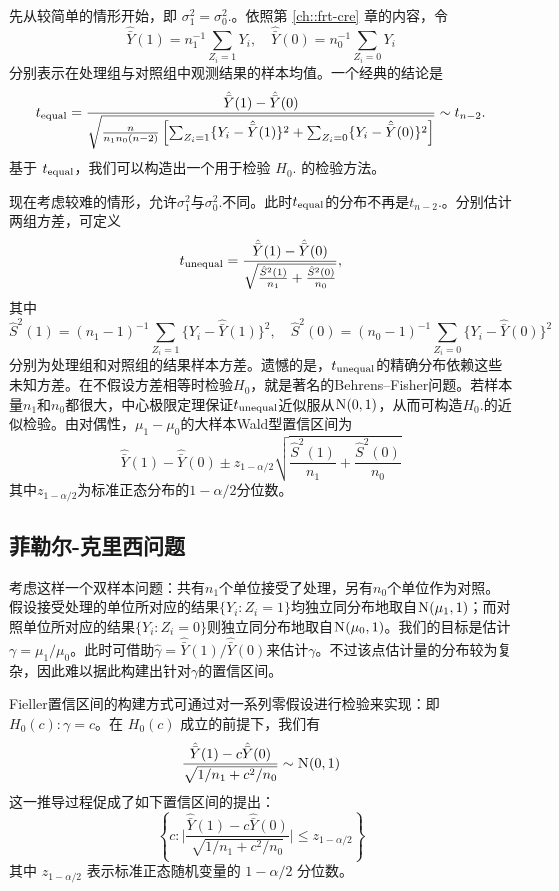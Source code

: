 先从较简单的情形开始，即 $\sigma_1^2  = \sigma_0^2.$。依照第 \ref{ch::frt-cre} 章的内容，令 $$
\hat{\bar{Y}}(1) = n_1^{-1} \sum_{Z_i =1}  Y_i ,\quad
\hat{\bar{Y}}(0) = n_0^{-1} \sum_{Z_i =0}  Y_i
$$ 分别表示在处理组与对照组中观测结果的样本均值。一个经典的结论是 $$
t_\textup{equal} = 
\frac{  \hat{\bar{Y}}(1) - \hat{\bar{Y}}(0)    }{  \sqrt{\frac{n}{n_1 n_0(n-2)}  \left[  \sum_{Z_i=1}  \{Y_i - \hat{\bar{Y}}(1)\}^2
+ \sum_{Z_i=0}  \{Y_i - \hat{\bar{Y}}(0)\}^2
    \right]  }    }   \sim t_{n-2}.
$$基于 $t_\textup{equal} $，我们可以构造出一个用于检验 $H_0.$ 的检验方法。


现在考虑较难的情形，允许$\sigma_1^2  $与$ \sigma_0^2.$不同。此时$t_\textup{equal}$的分布不再是$t_{n-2}.$。分别估计两组方差，可定义$$
t_\textup{unequal} = \frac{    \hat{\bar{Y}}(1)  -   \hat{\bar{Y}}(0)    }{  \sqrt{  \frac{  \hat{S}^2(1)  }{n_1}  + \frac{\hat{S}^2(0)}{n_0}  }   },
$$其中$$
\hat{S}^2(1) = (n_1 - 1)^{-1} \sum_{Z_i =1} \{ Y_i  -\hat{\bar{Y}}(1)   \}^2,\quad
\hat{S}^2(0) = (n_0 - 1)^{-1} \sum_{Z_i =0} \{ Y_i  -\hat{\bar{Y}}(0)   \}^2 
$$分别为处理组和对照组的结果样本方差。遗憾的是，$t_\textup{unequal} $的精确分布依赖这些未知方差。在不假设方差相等时检验$H_0$，就是著名的Behrens–Fisher问题。若样本量$n_1$和$n_0$都很大，中心极限定理保证$t_\textup{unequal} $近似服从$\N01$，从而可构造$H_0.$的近似检验。由对偶性，$\mu_1 - \mu_0$的大样本Wald型置信区间为$$
 \hat{\bar{Y}}(1)  -   \hat{\bar{Y}}(0)   \pm z_{1-\alpha/2}    \sqrt{  \frac{  \hat{S}^2(1)  }{n_1}  + \frac{\hat{S}^2(0)}{n_0}  }     
$$其中$z_{1-\alpha/2}$为标准正态分布的$1-\alpha/2$分位数。


 



\subsection{菲勒尔-克里西问题}\label{sec::fc-problem}

考虑这样一个双样本问题：共有$n_1$个单位接受了处理，另有$n_0$个单位作为对照。假设接受处理的单位所对应的结果$\{  Y_i: Z_i = 1 \}$均独立同分布地取自$\textsc{N} (\mu_1, 1)$；而对照单位所对应的结果$\{  Y_i: Z_i = 0 \}$则独立同分布地取自$\textsc{N} (\mu_0, 1)$。我们的目标是估计$\gamma = \mu_1 / \mu_0$。此时可借助$\hat\gamma = \hat{\bar{Y}}(1)  / \hat{\bar{Y}}(0) $来估计$\gamma$。不过该点估计量的分布较为复杂，因此难以据此构建出针对$\gamma$的置信区间。 



Fieller置信区间的构建方式可通过对一系列零假设进行检验来实现：即 $H_0(c): \gamma = c$。在 $H_0(c)$ 成立的前提下，我们有
$$
\frac{  \hat{\bar{Y}}(1)  - c \hat{\bar{Y}}(0) }{  \sqrt{ 1/n_1 + c^2/n_0  } } \sim \N01 
$$
这一推导过程促成了如下置信区间的提出：
$$
\left\{
c: \Big | \frac{  \hat{\bar{Y}}(1)  - c \hat{\bar{Y}}(0) }{  \sqrt{ 1/n_1 + c^2/n_0  } } \Big | \leq z_{1-\alpha/2}
\right\}
$$
其中 $z_{1-\alpha/2}$ 表示标准正态随机变量的 $1-\alpha/2$ 分位数。



